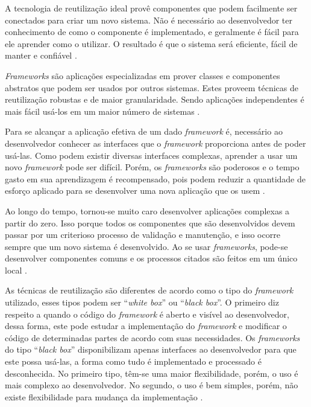 A tecnologia de reutilização ideal provê componentes que podem facilmente ser conectados para criar um novo sistema. Não é necessário ao desenvolvedor ter conhecimento de como o componente é implementado, e geralmente é fácil para ele aprender como o utilizar. O resultado é que o sistema será eficiente, fácil de manter e confiável \cite{Johnson:1997}.

\textit{Frameworks} são aplicações especializadas em prover classes e componentes abstratos que podem ser usados por outros sistemas. Estes proveem técnicas de reutilização robustas e de maior granularidade. Sendo aplicações independentes é mais fácil usá-los em um maior número de sistemas \cite{Johnson:Foote:1988}.

Para se alcançar a aplicação efetiva de um dado \textit{framework} é, necessário ao desenvolvedor conhecer as interfaces que o \textit{framework} proporciona antes de poder usá-las. Como podem existir diversas interfaces complexas, aprender a usar um novo \textit{framework} pode ser difícil. Porém, os \textit{frameworks} são poderosos e o tempo gasto em sua aprendizagem é recompensado, pois podem reduzir a quantidade de esforço aplicado para se desenvolver uma nova aplicação que os usem \cite{Johnson:1997}.

Ao longo do tempo, tornou-se muito caro desenvolver aplicações complexas a partir do zero. Isso porque todos os componentes que são desenvolvidos devem passar por um criterioso processo de validação e manutenção, e isso ocorre sempre que um novo sistema é desenvolvido. Ao se usar \textit{frameworks}, pode-se desenvolver componentes comuns e os processos citados são feitos em um único local \cite{Fayad:Schimidt:1997}.

As técnicas de reutilização são diferentes de acordo como o tipo do \textit{framework} utilizado, esses tipos podem ser ``\textit{white box}'' ou ``\textit{black box}''. O primeiro diz respeito a quando o código do \textit{framework} é aberto e visível ao desenvolvedor, dessa forma, este pode estudar a implementação do \textit{framework} e modificar o código de determinadas partes de acordo com suas necessidades. Os \textit{frameworks} do tipo ``\textit{black box}'' disponibilizam apenas interfaces ao desenvolvedor para que este possa usá-las, a forma como tudo é implementado e processado é desconhecida. No primeiro tipo, têm-se uma maior flexibilidade, porém, o uso é mais complexo ao desenvolvedor. No segundo, o uso é bem simples, porém, não existe flexibilidade para mudança da implementação \cite{Kroth:2000}.

